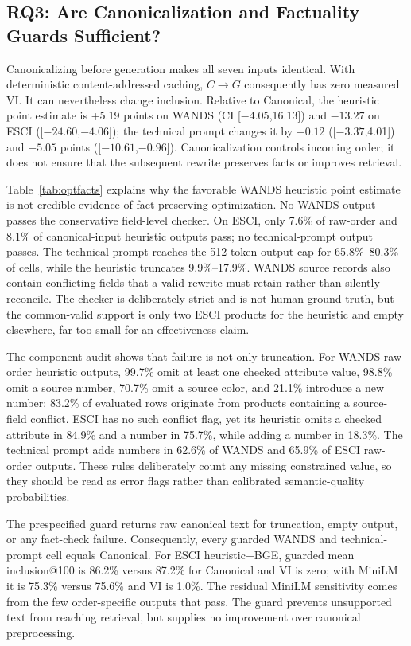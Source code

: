 \subsection{RQ3: Are Canonicalization and Factuality Guards Sufficient?}
Canonicalizing before generation makes all seven inputs identical. With deterministic content-addressed caching, $C\!\to\!G$ consequently has zero measured VI. It can nevertheless change inclusion. Relative to Canonical, the heuristic point estimate is +5.19 points on WANDS (CI [$-4.05$,16.13]) and $-13.27$ on ESCI ([$-24.60$,$-4.06$]); the technical prompt changes it by $-0.12$ ([$-3.37$,4.01]) and $-5.05$ points ([$-10.61$,$-0.96$]). Canonicalization controls incoming order; it does not ensure that the subsequent rewrite preserves facts or improves retrieval.



Table~\ref{tab:optfacts} explains why the favorable WANDS heuristic point estimate is not credible evidence of fact-preserving optimization. No WANDS output passes the conservative field-level checker. On ESCI, only 7.6\% of raw-order and 8.1\% of canonical-input heuristic outputs pass; no technical-prompt output passes. The technical prompt reaches the 512-token output cap for 65.8\%--80.3\% of cells, while the heuristic truncates 9.9\%--17.9\%. WANDS source records also contain conflicting fields that a valid rewrite must retain rather than silently reconcile. The checker is deliberately strict and is not human ground truth, but the common-valid support is only two ESCI products for the heuristic and empty elsewhere, far too small for an effectiveness claim.

The component audit shows that failure is not only truncation. For WANDS raw-order heuristic outputs, 99.7\% omit at least one checked attribute value, 98.8\% omit a source number, 70.7\% omit a source color, and 21.1\% introduce a new number; 83.2\% of evaluated rows originate from products containing a source-field conflict. ESCI has no such conflict flag, yet its heuristic omits a checked attribute in 84.9\% and a number in 75.7\%, while adding a number in 18.3\%. The technical prompt adds numbers in 62.6\% of WANDS and 65.9\% of ESCI raw-order outputs. These rules deliberately count any missing constrained value, so they should be read as error flags rather than calibrated semantic-quality probabilities.

The prespecified guard returns raw canonical text for truncation, empty output, or any fact-check failure. Consequently, every guarded WANDS and technical-prompt cell equals Canonical. For ESCI heuristic+BGE, guarded mean inclusion@100 is 86.2\% versus 87.2\% for Canonical and VI is zero; with MiniLM it is 75.3\% versus 75.6\% and VI is 1.0\%. The residual MiniLM sensitivity comes from the few order-specific outputs that pass. The guard prevents unsupported text from reaching retrieval, but supplies no improvement over canonical preprocessing.

